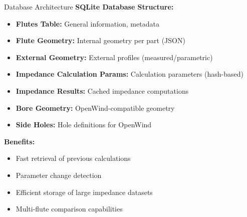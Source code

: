 \documentclass[aspectratio=169,10pt]{beamer}
\begin{document}
\begin{frame}{Database Architecture}
\textbf{SQLite Database Structure:}

\begin{itemize}
    \item \textbf{Flutes Table:} General information, metadata
    \item \textbf{Flute Geometry:} Internal geometry per part (JSON)
    \item \textbf{External Geometry:} External profiles (measured/parametric)
    \item \textbf{Impedance Calculation Params:} Calculation parameters (hash-based)
    \item \textbf{Impedance Results:} Cached impedance computations
    \item \textbf{Bore Geometry:} OpenWind-compatible geometry
    \item \textbf{Side Holes:} Hole definitions for OpenWind
\end{itemize}

\textbf{Benefits:}
\begin{itemize}
    \item Fast retrieval of previous calculations
    \item Parameter change detection
    \item Efficient storage of large impedance datasets
    \item Multi-flute comparison capabilities
\end{itemize}
\end{frame}
\end{document}
